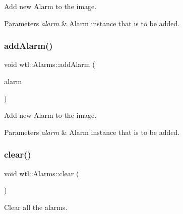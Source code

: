 Add new Alarm to the image. 


\begin{DoxyParams}{Parameters}
{\em alarm} & Alarm instance that is to be added. \\
\hline
\end{DoxyParams}
\mbox{\label{classwtl_1_1_alarms_af3ec2625ea7bf5b6e78a25a7728f5c1c}} 
\subsubsection{\texorpdfstring{add\+Alarm()}{addAlarm()}\hspace{0.1cm}{\footnotesize\ttfamily [2/2]}}
{\footnotesize\ttfamily void wtl\+::\+Alarms\+::add\+Alarm (\begin{DoxyParamCaption}\item[{const \hyperlink{structwtl_1_1_alarm_struct}{Alarm\+Struct} \&}]{alarm }\end{DoxyParamCaption})}



Add new Alarm to the image. 


\begin{DoxyParams}{Parameters}
{\em alarm} & Alarm instance that is to be added. \\
\hline
\end{DoxyParams}
\mbox{\label{classwtl_1_1_alarms_aaaa6b43ef25ae43721fa107bf2797895}} 
\subsubsection{\texorpdfstring{clear()}{clear()}}
{\footnotesize\ttfamily void wtl\+::\+Alarms\+::clear (\begin{DoxyParamCaption}{ }\end{DoxyParamCaption})}



Clear all the alarms. 

\mbox{\label{classwtl_1_1_alarms_a96edd28f3fa545d44afc773480391be6}} 
